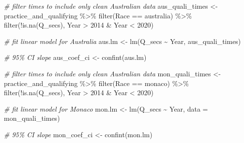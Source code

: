 \documentclass[
]{book}
\newenvironment{Shaded}{\begin{snugshade}}{\end{snugshade}}
\newcommand{\AttributeTok}[1]{\textcolor[rgb]{0.77,0.63,0.00}{#1}}
\newcommand{\CommentTok}[1]{\textcolor[rgb]{0.56,0.35,0.01}{\textit{#1}}}
\newcommand{\DecValTok}[1]{\textcolor[rgb]{0.00,0.00,0.81}{#1}}
\newcommand{\FunctionTok}[1]{\textcolor[rgb]{0.00,0.00,0.00}{#1}}
\newcommand{\NormalTok}[1]{#1}
\newcommand{\OtherTok}[1]{\textcolor[rgb]{0.56,0.35,0.01}{#1}}
\newcommand{\SpecialCharTok}[1]{\textcolor[rgb]{0.00,0.00,0.00}{#1}}
\newcommand{\StringTok}[1]{\textcolor[rgb]{0.31,0.60,0.02}{#1}}
\begin{document}
\begin{Shaded}
\begin{Highlighting}[]
\CommentTok{\# filter times to include only clean Australian data}
\NormalTok{aus\_quali\_times }\OtherTok{\textless{}{-}}\NormalTok{ practice\_and\_qualifying }\SpecialCharTok{\%\textgreater{}\%}
  \FunctionTok{filter}\NormalTok{(Race }\SpecialCharTok{==} \StringTok{\textquotesingle{}australia\textquotesingle{}}\NormalTok{) }\SpecialCharTok{\%\textgreater{}\%}
  \FunctionTok{filter}\NormalTok{(}\SpecialCharTok{!}\FunctionTok{is.na}\NormalTok{(Q\_secs),}
\NormalTok{         Year }\SpecialCharTok{\textgreater{}} \DecValTok{2014} \SpecialCharTok{\&}\NormalTok{ Year }\SpecialCharTok{\textless{}} \DecValTok{2020}\NormalTok{)}

\CommentTok{\# fit linear model for Australia}
\NormalTok{aus.lm }\OtherTok{\textless{}{-}} \FunctionTok{lm}\NormalTok{(Q\_secs }\SpecialCharTok{\textasciitilde{}}\NormalTok{ Year, aus\_quali\_times)}

\CommentTok{\# 95\% CI slope}
\NormalTok{aus\_coef\_ci }\OtherTok{\textless{}{-}} \FunctionTok{confint}\NormalTok{(aus.lm)}

\CommentTok{\# filter times to include only clean Australian data}
\NormalTok{mon\_quali\_times }\OtherTok{\textless{}{-}}\NormalTok{ practice\_and\_qualifying }\SpecialCharTok{\%\textgreater{}\%}
  \FunctionTok{filter}\NormalTok{(Race }\SpecialCharTok{==} \StringTok{\textquotesingle{}monaco\textquotesingle{}}\NormalTok{) }\SpecialCharTok{\%\textgreater{}\%}
  \FunctionTok{filter}\NormalTok{(}\SpecialCharTok{!}\FunctionTok{is.na}\NormalTok{(Q\_secs),}
\NormalTok{         Year }\SpecialCharTok{\textgreater{}} \DecValTok{2014} \SpecialCharTok{\&}\NormalTok{ Year }\SpecialCharTok{\textless{}} \DecValTok{2020}\NormalTok{)}

\CommentTok{\# fit linear model for Monaco}
\NormalTok{mon.lm }\OtherTok{\textless{}{-}} \FunctionTok{lm}\NormalTok{(Q\_secs }\SpecialCharTok{\textasciitilde{}}\NormalTok{ Year, }\AttributeTok{data =}\NormalTok{ mon\_quali\_times)}

\CommentTok{\# 95\% CI slope}
\NormalTok{mon\_coef\_ci }\OtherTok{\textless{}{-}} \FunctionTok{confint}\NormalTok{(mon.lm)}
\end{Highlighting}
\end{Shaded}
\end{document}
